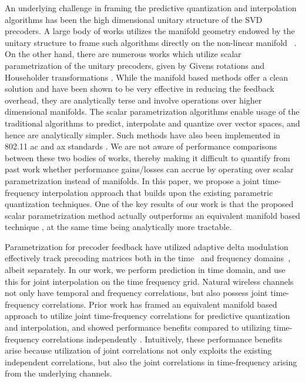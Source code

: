 \documentclass[journal,10pt,twocolumn]{IEEEtran}
\begin{document}
An underlying challenge in framing the predictive quantization and interpolation algorithms has been the high dimensional unitary structure of the SVD precoders. A large body of works utilizes the manifold geometry endowed by the unitary structure to frame such algorithms directly on the non-linear manifold ~\cite{mondal2007quantization,schwarz2013adaptive,5946308,6891198,Gupt1905:Predictive,pitaval2013codebooks}. On the other hand, there are numerous works which utilize scalar parametrization of the unitary precoders, given by Givens rotations and Householder transformations \cite{4114278,4556174,lou2013comparison}. While the manifold based methods offer a clean solution and have been shown to be very effective in reducing the feedback overhead, they are analytically terse and
involve operations over higher dimensional manifolds. The scalar parametrization algorithms enable usage of the traditional algorithms to predict, interpolate and quantize over vector spaces, and hence are analytically simpler.
Such methods have also been implemented in 802.11 ac and ax standards
\cite{lou2013comparison,ieee80211}. We are not aware of performance comparisons
between these two bodies of works, thereby making it difficult to
quantify from past work whether performance gains/losses can accrue by operating over scalar parametrization instead of manifolds. In this paper, we propose a joint time-frequency interpolation approach that builds upon the existing parametric quantization techniques. One of the key results of our work is that the proposed scalar parametrization method actually outperforms an equivalent manifold based technique \cite{Gupt1905:Predictive}, at the same time being analytically more tractable.

Parametrization for precoder feedback have utilized adaptive delta
modulation effectively track precoding matrices both in the
time~\cite{4114278} and frequency domains~\cite{4556174}, albeit
separately. In our work, we perform prediction in time domain, and use this for joint interpolation on the time frequency grid. 
Natural wireless channels not only have temporal and
frequency correlations, but also possess joint time-frequency
correlations. 
Prior work \cite{Gupt1905:Predictive} has framed an equivalent manifold based approach to utilize joint time-frequency correlations for predictive quantization and interpolation, and showed performance benefits compared to utilizing time-frequency correlations independently \cite{6891198,khaled2005quantized}.
Intuitively, these performance benefits arise because utilization of joint
correlations not only exploits the existing independent correlations,
but also the joint correlations in time-frequency arising from the underlying channels.
\end{document}
